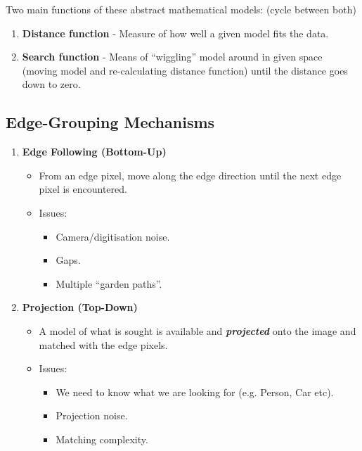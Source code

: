 \documentclass[english, 10pt]{article}
\begin{document}
  Two main functions of these abstract mathematical models: (cycle between both)

  \begin{enumerate}
  \def\labelenumi{\arabic{enumi}.}
  \item
    \textbf{Distance function} - Measure of how well a given model fits
    the data.
  \item
    \textbf{Search function} - Means of ``wiggling'' model around in
    given space (moving model and re-calculating distance function)
    until the distance goes down to zero.
  \end{enumerate}

\subsection{Edge-Grouping Mechanisms}

\begin{enumerate}

\item \textbf{Edge Following (Bottom-Up)}

\begin{itemize}
 \item
    From an edge pixel, move along the edge direction until the next
    edge pixel is encountered.
\item
  Issues:

  \begin{itemize}
  \itemsep1pt\parskip0pt
  \item
    Camera/digitisation noise.
  \item
    Gaps.
  \item
    Multiple ``garden paths''.
  \end{itemize}
\end{itemize}

\item \textbf{Projection (Top-Down)}

\begin{itemize}
\item
  A model of what is sought is available and \textbf{\emph{projected}}
  onto the image and matched with the edge pixels.
\item
  Issues:

  \begin{itemize}
  \itemsep1pt\parskip0pt
  \item
    We need to know what we are looking for (e.g. Person, Car etc).
  \item
    Projection noise.
  \item
    Matching complexity.
  \end{itemize}
  \end{itemize}
\end{enumerate}
\end{document}
